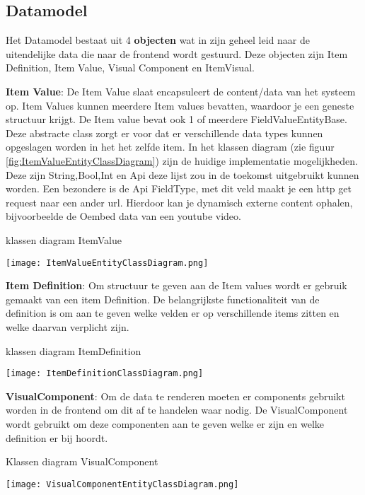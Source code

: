 \subsection{Datamodel}
Het Datamodel bestaat uit 4 \textbf{objecten} wat in zijn geheel leid naar de uitendelijke data die naar de frontend wordt gestuurd.
Deze objecten zijn Item Definition, Item Value, Visual Component en ItemVisual.

\whitespace[2]
\textbf{Item Value}: De Item Value slaat encapsuleert de content/data van het systeem op.
Item Values kunnen meerdere Item values bevatten, waardoor je een geneste structuur krijgt.
De Item value bevat ook 1 of meerdere FieldValueEntityBase.
Deze abstracte class zorgt er voor dat er verschillende data types kunnen opgeslagen worden in het het zelfde item.
In het klassen diagram (zie figuur \ref{fig:ItemValueEntityClassDiagram}) zijn de huidige implementatie mogelijkheden.
Deze zijn String,Bool,Int en Api deze lijst zou in de toekomst uitgebruikt kunnen worden.
Een bezondere is de Api FieldType, met dit veld maakt je een http get request naar een ander url.
Hierdoor kan je dynamisch externe content ophalen, bijvoorbeelde de Oembed data van een youtube video.

\whitespace[2]
\begin{graphic}
    \captionsetup{type=figure}
    \caption{klassen diagram ItemValue}
    \texttt{[image: ItemValueEntityClassDiagram.png]}
    \label{fig:ItemValueEntityClassDiagram}
\end{graphic}

\whitespace[2]
\textbf{Item Definition}: Om structuur te geven aan de Item values wordt er gebruik gemaakt van een item Definition.
        De belangrijkste functionaliteit van de definition is om aan te geven welke velden er op verschillende items zitten en welke daarvan verplicht zijn.

\whitespace[2]
\begin{graphic}
    \captionsetup{type=figure}
    \caption{klassen diagram ItemDefinition}
    \texttt{[image: ItemDefinitionClassDiagram.png]}
    \label{fig:ItemDefinitionClassDiagram}
\end{graphic}

\whitespace[2]
\textbf{VisualComponent}: Om de data te renderen moeten er components gebruikt worden in de frontend om dit af te handelen waar nodig.
De VisualComponent wordt gebruikt om deze componenten aan te geven welke er zijn en welke definition er bij hoordt.

\whitespace[2]
\begin{graphic}
    \captionsetup{type=figure}
    \caption{Klassen diagram VisualComponent}
    \texttt{[image: VisualComponentEntityClassDiagram.png]}
    \label{fig:VisualComponentEntityClassDiagram}
\end{graphic}

